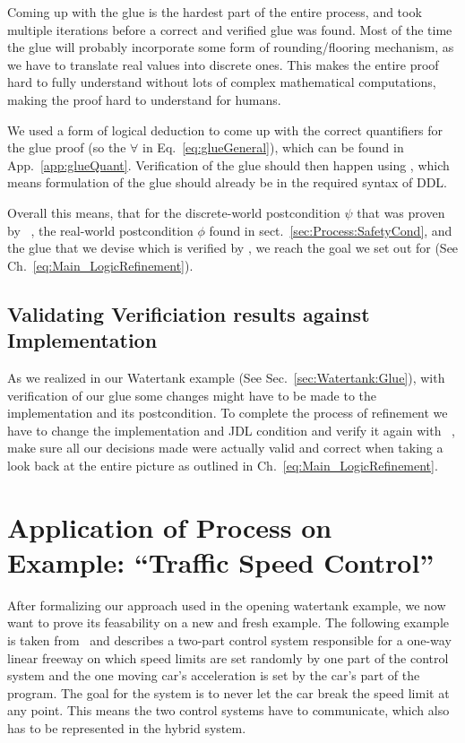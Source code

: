 Coming up with the glue is the hardest part of the entire process, and took multiple iterations before a correct and verified glue was found. Most of the time the glue will probably incorporate some form of rounding/flooring mechanism, as we have to translate real values into discrete ones. This makes the entire proof hard to fully understand without lots of complex mathematical computations, making the proof hard to understand for humans.

We used a form of logical deduction to come up with the correct quantifiers for the glue proof (so the \(\forall\) in Eq.~\ref{eq:glueGeneral}), which can be found in App.~\ref{app:glueQuant}. Verification of the glue should then happen using \keym, which means formulation of the glue should already be in the required syntax of DDL.

Overall this means, that for the discrete-world postcondition \(\psi\) that was proven by \key~, the real-world postcondition \(\phi\) found in sect.~\ref{sec:Process:SafetyCond}, and the glue that we devise which is verified by \keym, we reach the goal we set out for (See Ch.~\ref{eq:Main_LogicRefinement}).

\section{Validating Verificiation results against Implementation}
\label{sec:Process:Eval}

As we realized in our Watertank example (See Sec.~\ref{sec:Watertank:Glue}), with verification of our glue some changes might have to be made to the implementation and its postcondition. To complete the process of refinement we have to change the implementation and JDL condition and verify it again with \key~, make sure all our decisions made were actually valid and correct when taking a look back at the entire picture as outlined in Ch.~\ref{eq:Main_LogicRefinement}.


\chapter{Application of Process on Example: ``Traffic Speed Control''}
\label{ch:Traffic}

After formalizing our approach used in the opening watertank example, we now want to prove its feasability on a new and fresh example. The following example is taken from~\cite{TrafficControl} and describes a two-part control system responsible for a one-way linear freeway on which speed limits are set randomly by one part of the control system and the one moving car's acceleration is set by the car's part of the program. The goal for the system is to never let the car break the speed limit at any point. This means the two control systems have to communicate, which also has to be represented in the hybrid system.  

